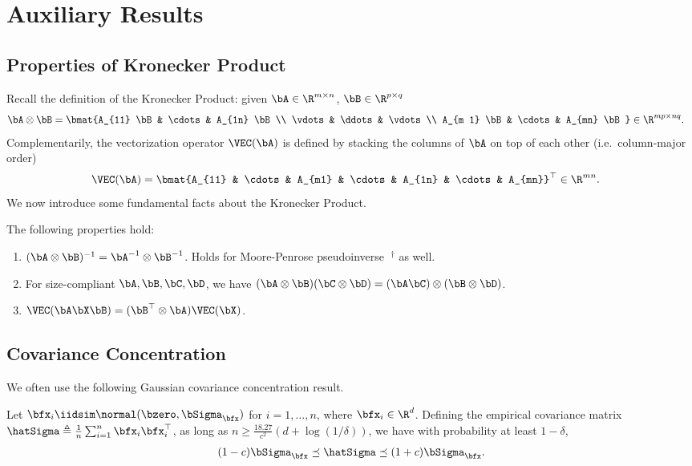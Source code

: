 \section{Auxiliary Results}\label{sec:aux_results}

\subsection{Properties of Kronecker Product}
Recall the definition of the Kronecker Product: given $\bA \in \R^{m \times n}$, $\bB \in \R^{p \times q}$
\begin{align*}
    \bA \otimes \bB &= \bmat{A_{11} \bB & \cdots & A_{1n} \bB \\ 
    \vdots & \ddots & \vdots \\
    A_{m 1} \bB & \cdots & A_{mn} \bB} \in \R^{mp \times nq}.
\end{align*}
Complementarily, the vectorization operator $\VEC(\bA)$ is defined by stacking the columns of $\bA$ on top of each other (i.e.\ column-major order)
\begin{align*}
    \VEC(\bA) &= \bmat{A_{11} & \cdots & A_{m1} & \cdots & A_{1n} & \cdots & A_{mn}}^\top \in \R^{mn}.
\end{align*}
We now introduce some fundamental facts about the Kronecker Product.
\begin{lemma}\label{lem:kron_properties}
    The following properties hold:
    \begin{enumerate}
        \item $(\bA \otimes \bB)^{-1} = \bA^{-1} \otimes \bB^{-1}$. Holds for Moore-Penrose pseudoinverse $\;^{\dagger}$ as well.
        \item For size-compliant $\bA, \bB, \bC, \bD$, we have $(\bA \otimes \bB) (\bC \otimes \bD) = (\bA \bC) \otimes (\bB \otimes \bD)$.
        \item $\VEC(\bA\bX\bB) = (\bB^\top \otimes \bA)\VEC(\bX)$.
    \end{enumerate}
\end{lemma}


\subsection{Covariance Concentration}


We often use the following Gaussian covariance concentration result.
\begin{lemma}\label{lem:gauss_cov_conc}
    Let $\bfx_i \iidsim \normal(\bzero, \bSigma_\bfx)$ for $i = 1,\dots,n$, where $\bfx_i \in \R^d$. Defining the empirical covariance matrix $\hatSigma \triangleq \frac{1}{n}\sum_{i=1}^n \bfx_i \bfx_i^\top$, as long as $n \geq \frac{18.27}{c^2} (d + \log(1/\delta))$, we have with probability at least $1 - \delta$,
    \begin{align*}
        (1-c) \bSigma_\bfx \preceq \hatSigma \preceq (1+c) \bSigma_\bfx.
    \end{align*}
\end{lemma}

